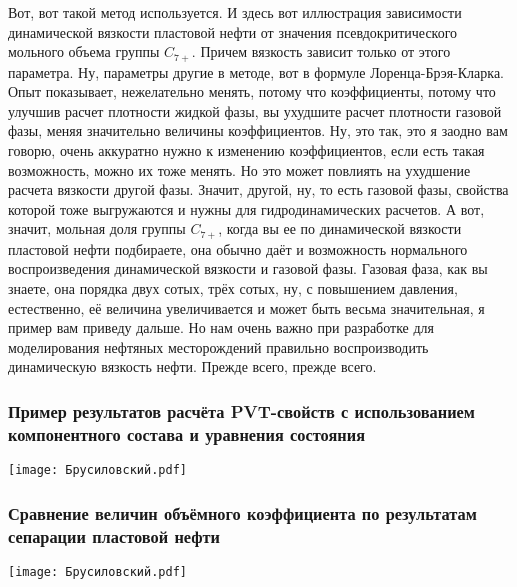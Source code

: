 \documentclass[main.tex]{subfiles}
\begin{document}
Вот, вот такой метод используется.
И здесь вот иллюстрация зависимости динамической вязкости пластовой нефти от значения псевдокритического мольного объема группы $C_{7+}$.
Причем вязкость зависит только от этого параметра.
Ну, параметры другие в методе, вот в формуле Лоренца-Брэя-Кларка.
Опыт показывает, нежелательно менять, потому что коэффициенты, потому что улучшив расчет плотности жидкой фазы, вы ухудшите расчет плотности газовой фазы, меняя значительно величины коэффициентов.
Ну, это так, это я заодно вам говорю, очень аккуратно нужно к изменению коэффициентов, если есть такая возможность, можно их тоже менять.
Но это может повлиять на ухудшение расчета вязкости другой фазы.
Значит, другой, ну, то есть газовой фазы, свойства которой тоже выгружаются и нужны для гидродинамических расчетов.
А вот, значит, мольная доля группы $C_{7+}$, когда вы ее по динамической вязкости пластовой нефти подбираете, она обычно даёт и возможность нормального воспроизведения динамической вязкости и газовой фазы.
Газовая фаза, как вы знаете, она порядка двух сотых, трёх сотых, ну, с повышением давления, естественно, её величина увеличивается и может быть весьма значительная, я пример вам приведу дальше.
Но нам очень важно при разработке для моделирования нефтяных месторождений правильно воспроизводить динамическую вязкость нефти.
Прежде всего, прежде всего.

\subsubsection{Пример результатов расчёта PVT-свойств с использованием компонентного состава и уравнения состояния}

\begin{center}
\texttt{[image: Брусиловский.pdf]}
\end{center}



\subsubsection{Сравнение величин объёмного коэффициента по результатам сепарации пластовой нефти}

\begin{center}
\texttt{[image: Брусиловский.pdf]}
\end{center}
\end{document}
